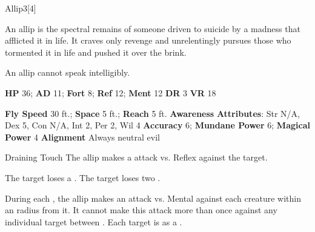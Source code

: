   \begin{monsection}{Allip}{3}[4]
    \vspace{-1em}\vspace{-1em}
    \vspace{0em}

    
      An allip is the spectral remains of someone driven to suicide by a madness that afflicted it in life.
      It craves only revenge and unrelentingly pursues those who tormented it in life and pushed it over the brink.

      An allip cannot speak intelligibly.
    
    

    \begin{spellcontent}
      \begin{spelltargetinginfo}
        \pari \textbf{HP} 36;
          \textbf{AD} 11;
          \textbf{Fort} 8;
          \textbf{Ref} 12;
          \textbf{Ment} 12
        \pari \textbf{DR} 3
        \pari \textbf{VR} 18
        
      \end{spelltargetinginfo}
    \end{spellcontent}
    \begin{monsterfooter}
      \pari \textbf{Fly Speed} 30 ft.;
        \textbf{Space} 5 ft.;
        \textbf{Reach} 5 ft.
      \pari \textbf{Awareness} 
      \pari \textbf{Attributes}:
        Str N/A, Dex 5,
        Con N/A, Int 2,
        Per 2, Wil 4
      \pari \textbf{Accuracy} 6;
        \textbf{Mundane Power} 6;
      \textbf{Magical Power} 4
      \pari \textbf{Alignment} Always neutral evil
    \end{monsterfooter}
  \end{monsection}
  \begin{freeability}{Draining Touch}
       The allip makes a  attack
        vs. Reflex against the target.
    
    \hit The target loses a .
    \crit The target loses two .
    \end{freeability}
  
          During each , the allip makes an attack vs. Mental against each creature
          within an \arealarge radius  from it.
          It cannot make this attack more than once against any individual target between .
          \hit Each target is  as a .
        
